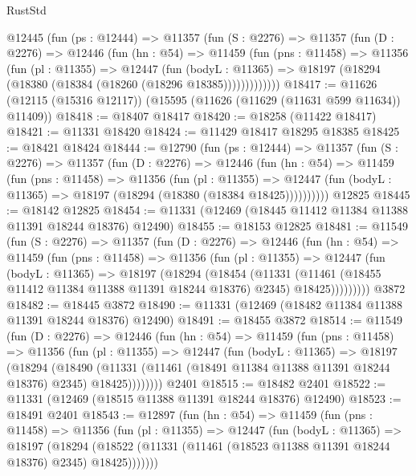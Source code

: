 \begin{lexlean}{RustStd}
\begin{coremodule}
    @12445
      (fun (ps : @12444) =>
      @11357
        (fun (S : @2276) =>
        @11357
          (fun (D : @2276) =>
          @12446
            (fun (hn : @54) =>
            @11459
              (fun (pns : @11458) =>
              @11356
                (fun (pl : @11355) =>
                @12447
                  (fun (bodyL : @11365) =>
                  @18197 (@18294 (@18380 (@18384 (@18260 (@18296 @18385)))))))))))))
@18417 := @11626 (@12115 (@15316 @12117)) (@15595 (@11626 (@11629 (@11631 @599 @11634)) @11409))
@18418 := @18407 @18417
@18420 := @18258 (@11422 @18417)
@18421 := @11331 @18420
@18424 := @11429 @18417 @18295 @18385
@18425 := @18421 @18424
@18444 := @12790
    (fun (ps : @12444) =>
    @11357
      (fun (S : @2276) =>
      @11357
        (fun (D : @2276) =>
        @12446
          (fun (hn : @54) =>
          @11459
            (fun (pns : @11458) =>
            @11356
              (fun (pl : @11355) =>
              @12447 (fun (bodyL : @11365) => @18197 (@18294 (@18380 (@18384 @18425))))))))))
    @12825
@18445 := @18142 @12825
@18454 := @11331 (@12469 (@18445 @11412 @11384 @11388 @11391 @18244 @18376) @12490)
@18455 := @18153 @12825
@18481 := @11549
    (fun (S : @2276) =>
    @11357
      (fun (D : @2276) =>
      @12446
        (fun (hn : @54) =>
        @11459
          (fun (pns : @11458) =>
          @11356
            (fun (pl : @11355) =>
            @12447
              (fun (bodyL : @11365) =>
              @18197
                (@18294
                  (@18454
                    (@11331
                      (@11461 (@18455 @11412 @11384 @11388 @11391 @18244 @18376) @2345)
                      @18425)))))))))
    @3872
@18482 := @18445 @3872
@18490 := @11331 (@12469 (@18482 @11384 @11388 @11391 @18244 @18376) @12490)
@18491 := @18455 @3872
@18514 := @11549
    (fun (D : @2276) =>
    @12446
      (fun (hn : @54) =>
      @11459
        (fun (pns : @11458) =>
        @11356
          (fun (pl : @11355) =>
          @12447
            (fun (bodyL : @11365) =>
            @18197
              (@18294
                (@18490
                  (@11331 (@11461 (@18491 @11384 @11388 @11391 @18244 @18376) @2345) @18425))))))))
    @2401
@18515 := @18482 @2401
@18522 := @11331 (@12469 (@18515 @11388 @11391 @18244 @18376) @12490)
@18523 := @18491 @2401
@18543 := @12897
    (fun (hn : @54) =>
    @11459
      (fun (pns : @11458) =>
      @11356
        (fun (pl : @11355) =>
        @12447
          (fun (bodyL : @11365) =>
          @18197
            (@18294
              (@18522 (@11331 (@11461 (@18523 @11388 @11391 @18244 @18376) @2345) @18425)))))))

\end{coremodule}
\end{lexlean}
